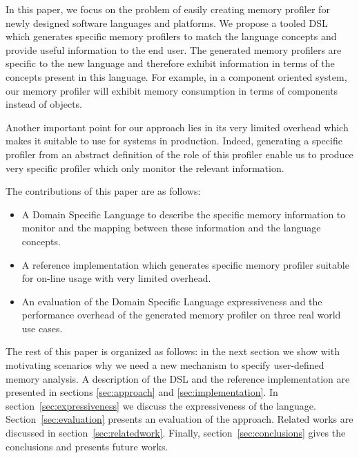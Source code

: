 In this paper, we focus on the problem of easily creating memory profiler for newly designed software languages and platforms. 
We propose a tooled DSL which generates specific memory profilers to match the language concepts and provide useful information to the end user. 
The generated memory profilers are specific to the new language and therefore exhibit information in terms of the concepts present in this language. 
For example, in a component oriented system, our memory profiler will exhibit memory consumption in terms of components instead of objects.

Another important point for our approach lies in its very limited overhead which makes it suitable to use for systems in production.
Indeed, generating a specific profiler from an abstract definition of the role of this profiler enable us to produce very specific profiler which only monitor the relevant information.

The contributions of this paper are as follows:
\begin{itemize}
\item A Domain Specific Language to describe the specific memory information to monitor and the mapping between these information and the language concepts. 
\item A reference implementation which generates specific memory profiler suitable for on-line usage with very limited overhead.
\item An evaluation of the Domain Specific Language expressiveness and the performance overhead of the generated memory profiler on three real world use cases.
\end{itemize}

The rest of this paper is organized as follows: in the next section we show with motivating scenarios why we need a new mechanism to specify user-defined memory analysis.
A description of the DSL and the reference implementation are presented in sections
\ref{sec:approach} and \ref{sec:implementation}.
In section~\ref{sec:expressiveness} we discuss the expressiveness of the language.
Section~\ref{sec:evaluation} presents an evaluation of the approach.
Related works are discussed in section~\ref{sec:relatedwork}.
Finally, section~\ref{sec:conclusions} gives the conclusions and presents future works.